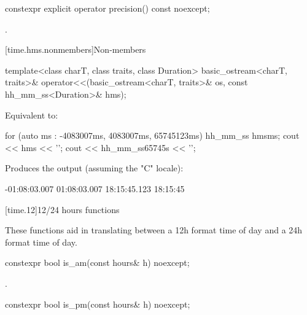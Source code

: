 %
\begin{itemdecl}
constexpr explicit operator precision() const noexcept;
\end{itemdecl}

\begin{itemdescr}
\pnum
\returns
{}.
\end{itemdescr}

[time.hms.nonmembers]{Non-members}

\begin{itemdecl}
template<class charT, class traits, class Duration>
basic_ostream<charT, traits>&
operator<<(basic_ostream<charT, traits>& os, const hh_mm_ss<Duration>& hms);
\end{itemdecl}

\begin{itemdescr}
\pnum
\effects
Equivalent to:

\pnum
\begin{example}
\begin{codeblock}
for (auto ms : {-4083007ms, 4083007ms, 65745123ms}) {
  hh_mm_ss hms{ms};
  cout << hms << '\n';
}
cout << hh_mm_ss{65745s} << '\n';
\end{codeblock}
Produces the output (assuming the "C" locale):
\begin{codeblock}
-01:08:03.007
01:08:03.007
18:15:45.123
18:15:45
\end{codeblock}
\end{example}
\end{itemdescr}

[time.12]{12/24 hours functions}

\pnum
These functions aid in translating between a 12h format time of day
and a 24h format time of day.

%
\begin{itemdecl}
constexpr bool is_am(const hours& h) noexcept;
\end{itemdecl}

\begin{itemdescr}
\pnum
\returns
{}.
\end{itemdescr}

%
\begin{itemdecl}
constexpr bool is_pm(const hours& h) noexcept;
\end{itemdecl}

